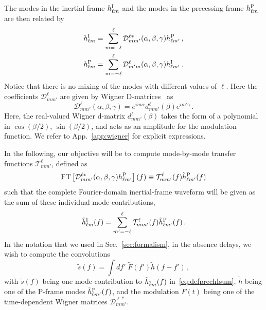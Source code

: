 \documentclass[aps,showpacs,twocolumn,
prd,superscriptaddress,nofootinbib]{revtex4-1}
\newcommand{\be}{\begin{equation}}
\newcommand{\ee}{\end{equation}}
\newcommand\calT{{\mathcal{T}}}
\newcommand\calD{{\mathcal{D}}}
\begin{document}
The modes in the inertial frame $h_{\ell m}^{\rm I}$ and the modes in the precessing frame $h_{\ell m}^{\rm P}$ are then related by~\cite{Goldberg+67}
\begin{subequations}
\label{eq:wignerrot}
\begin{align}
	h_{\ell m}^{\rm I} = \sum\limits_{m=-\ell}^{\ell} \calD^{\ell *}_{mm'} (\alpha,\beta,\gamma) h_{\ell m'}^{\rm P} \,, \\
	h_{\ell m}^{\rm P} = \sum\limits_{m=-\ell}^{\ell} \calD^{\ell }_{m'm} (\alpha,\beta,\gamma) h_{\ell m'}^{\rm I} \,.
\end{align}
\end{subequations}
Notice that there is no mixing of the modes with different values of $\ell$. Here the coefficients $\calD^{\ell}_{mm'}$ are given by Wigner D-matrices~\cite{Wigner59} as
\be\label{eq:defWignerD}
	\calD^{\ell}_{mm'} (\alpha, \beta, \gamma) = e^{im \alpha} d^{\ell}_{mm'}(\beta) e^{im' \gamma}\,.
\ee
Here, the real-valued Wigner d-matrix $d^{\ell}_{mm'}(\beta)$ takes the form of a polynomial in $\cos (\beta/2)$, $\sin (\beta/2)$, and acts as an amplitude for the modulation function. We refer to App.~\ref{app:wigner} for explicit expressions.

In the following, our objective will be to compute mode-by-mode transfer functions $\calT^{\ell}_{mm'}$, defined as
\be\label{eq:defprectransfer}
	\mathrm{FT} \left[ \calD^{\ell *}_{mm'} (\alpha,\beta,\gamma) h_{\ell m'}^{\rm P} \right] (f) \equiv \calT^{\ell}_{mm'}(f) \tilde{h}_{\ell m'}^{\rm P} (f)
\ee
such that the complete Fourier-domain inertial-frame waveform will be given as the sum of these individual mode contributions,
\be\label{eq:defprechIsum}
	\tilde{h}_{\ell m}^{\rm I} (f) = \sum\limits_{m'=-\ell}^{\ell} \calT^{\ell}_{mm'}(f) \tilde{h}_{\ell m'}^{\rm P} (f) \,.
\ee
In the notation that we used in Sec.~\ref{sec:formalism}, in the absence delays, we wish to compute the convolutions
\be\label{eq:precconvolution}
	\tilde{s} (f) = \int df' \; \tilde{F}(f') \tilde{h} (f-f') \,,
\ee
with $\tilde{s}(f)$ being one mode contribution to $\tilde{h}_{\ell m}^{\rm I} (f)$ in~\eqref{eq:defprechIsum}, $\tilde{h}$ being one of the P-frame modes $\tilde{h}_{\ell m'}^{\rm P} (f)$, and the modulation $F(t)$ being one of the time-dependent Wigner matrices $\calD^{\ell *}_{mm'}$.
\end{document}
